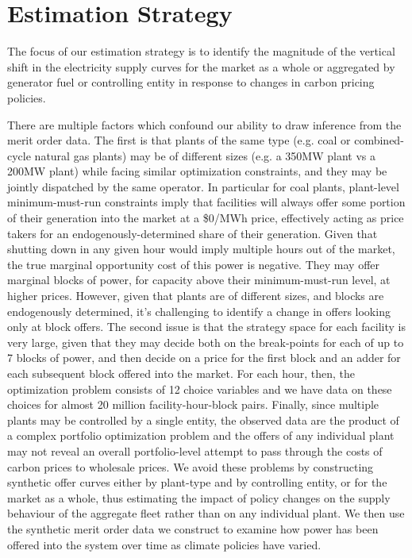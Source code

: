 \documentclass[12pt]{article}
\begin{document}
\section{Estimation Strategy}\label{sec:est}
The focus of our estimation strategy is to identify the magnitude of the vertical shift in the electricity supply curves for the market as a whole or aggregated by generator fuel or controlling entity in response to changes in carbon pricing policies.

There are multiple factors which confound our ability to draw inference from the merit order data. The first is that plants of the same type (e.g. coal or combined-cycle natural gas plants) may be of different sizes (e.g. a 350MW plant vs a 200MW plant) while facing similar optimization constraints, and they may be jointly dispatched by the same operator. In particular for coal plants, plant-level minimum-must-run constraints imply that facilities will always offer some portion of their generation into the market at a \$0/MWh price, effectively acting as price takers for an endogenously-determined share of their generation. Given that shutting down in any given hour would imply multiple hours out of the market, the true marginal opportunity cost of this power is negative. They may offer marginal blocks of power, for capacity above their minimum-must-run level, at higher prices. However, given that plants are of different sizes, and blocks are endogenously determined, it's challenging to identify a change in offers looking only at block offers. The second issue is that the strategy space for each facility is very large, given that they may decide both on the break-points for each of up to 7 blocks of power, and then decide on a price for the first block and an adder for each subsequent block offered into the market. For each hour, then, the optimization problem consists of 12 choice variables and we have data on these choices for almost 20 million facility-hour-block pairs. Finally, since multiple plants may be controlled by a single entity, the observed data are the product of a complex portfolio optimization problem and the offers of any individual plant may not reveal an overall portfolio-level attempt to pass through the costs of carbon prices to wholesale prices. We avoid these problems by constructing synthetic offer curves either by plant-type and by controlling entity, or for the market as a whole, thus estimating the impact of policy changes on the supply behaviour of the aggregate fleet rather than on any individual plant. We then use the synthetic merit order data we construct to examine how power has been offered into the system over time as climate policies have varied.
\end{document}
